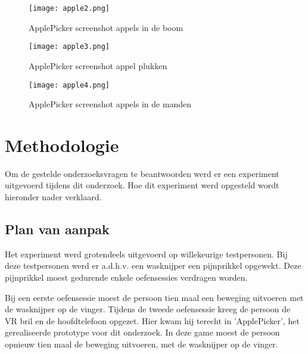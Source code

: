 \begin{figure}[h]
    \centering
    \texttt{[image: apple2.png]}
    \caption{ApplePicker screenshot appels in de boom}
\end{figure}

\begin{figure}[h]
    \centering
    \texttt{[image: apple3.png]}
    \caption{ApplePicker screenshot appel plukken}
\end{figure}

\begin{figure}[h]
    \centering
    \texttt{[image: apple4.png]}
    \caption{ApplePicker screenshot appels in de manden}
\end{figure}


\chapter{Methodologie}
\label{ch:methodologie}


Om de gestelde onderzoeksvragen te beantwoorden werd er een experiment uitgevoerd tijdens dit onderzoek.
Hoe dit experiment werd opgesteld wordt hieronder nader verklaard.

\section{Plan van aanpak}

Het experiment werd grotendeels uitgevoerd op willekeurige testpersonen. Bij deze testpersonen werd er a.d.h.v. een wasknijper een pijnprikkel opgewekt. Deze pijnprikkel moest gedurende enkele oefensessies verdragen worden.

Bij een eerste oefensessie moest de persoon tien maal een beweging uitvoeren met de wasknijper op de vinger. 
Tijdens de tweede oefensessie kreeg de persoon de VR bril en de hoofdtelefoon opgezet. Hier kwam hij terecht in 'ApplePicker', het gerealiseerde prototype voor dit onderzoek. In deze game moest de persoon opnieuw tien maal de beweging uitvoeren, met de wasknijper op de vinger.

